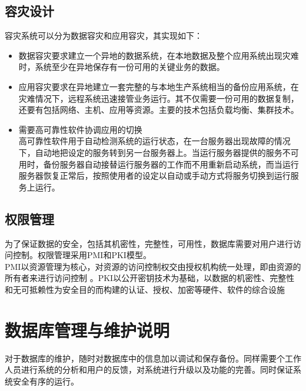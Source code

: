 \subsection{容灾设计}
容灾系统可以分为数据容灾和应用容灾，其实现如下：
\begin{itemize}
     
\item 数据容灾要求建立一个异地的数据系统，在本地数据及整个应用系统出现灾难时，系统至少在异地保存有一份可用的关键业务的数据。

\item 应用容灾要求在异地建立一套完整的与本地生产系统相当的备份应用系统，在灾难情况下，远程系统迅速接管业务运行。其不仅需要一份可用的数据复制，还要有包括网络、主机、应用等资源。主要的技术包括负载均衡、集群技术。

\item 需要高可靠性软件协调应用的切换 \\
高可靠性软件用于自动检测系统的运行状态，在一台服务器出现故障的情况下，自动地把设定的服务转到另一台服务器上。当运行服务器提供的服务不可用时，备份服务器自动接替运行服务器的工作而不用重新启动系统，而当运行服务器恢复正常后，按照使用者的设定以自动或手动方式将服务切换到运行服务上运行。
\end{itemize}

\subsection{权限管理}
为了保证数据的安全，包括其机密性，完整性，可用性，数据库需要对用户进行访问控制。权限管理采用PMI和PKI模型。\\
PMI以资源管理为核心，对资源的访问控制权交由授权机构统一处理，即由资源的所有者来进行访问控制 。PKI以公开密钥技术为基础，以数据的机密性、完整性和无可抵赖性为安全目的而构建的认证、授权、加密等硬件、软件的综合设施


\section{数据库管理与维护说明}
对于数据库的维护，随时对数据库中的信息加以调试和保存备份。同样需要个工作人员进行系统的分析和用户的反馈，对系统进行升级以及功能的完善。同时保证系统安全有序的运行。